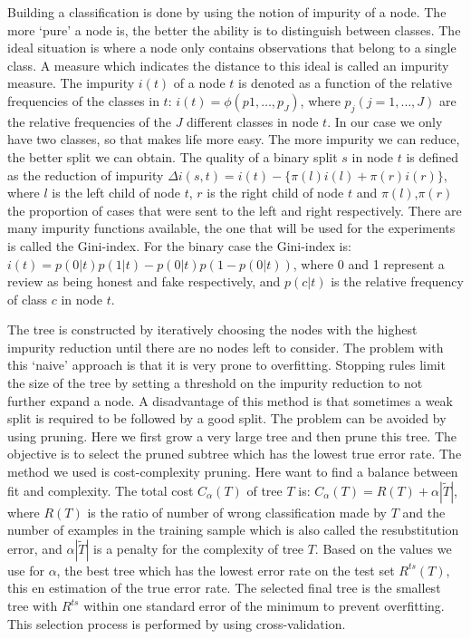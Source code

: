 \documentclass[a4paper,11pt]{article}
\begin{document}
Building a classification is done by using the notion of impurity of a node. The more `pure' a node is, the better the ability is to distinguish between classes. The ideal situation is where a node only contains observations that belong to a single class. A measure which indicates the distance to this ideal is called an impurity measure. The impurity $i(t)$ of a node $t$ is denoted as a function of the relative frequencies of the classes in $t$: $i(t) = \phi(p1,\ldots,p_J)$, where $p_j(j=1,\ldots, J)$ are the relative frequencies of the $J$ different classes in node $t$. In our case we only have two classes, so that makes life more easy. The more impurity we can reduce, the better split we can obtain. The quality of a binary split $s$ in node $t$ is defined as the reduction of impurity $\Delta i(s,t) = i(t) - \{\pi(l)i(l)+\pi(r)i(r)\}$, where $l$ is the left child of node $t$, $r$ is the right child of node $t$ and $\pi(l)$,$\pi(r)$ the proportion of cases that were sent to the left and right respectively. There are many impurity functions available, the one that will be used for the experiments is called the Gini-index. For the binary case the Gini-index is: $i(t) = p(0|t)p(1|t) - p(0|t)p(1-p(0|t))$, where 0 and 1 represent a review as being honest and fake respectively, and $p(c|t)$ is the relative frequency of class $c$ in node $t$. 

The tree is constructed by iteratively choosing the nodes with the highest impurity reduction until there are no nodes left to consider. The problem with this `naive' approach is that it is very prone to overfitting. Stopping rules limit the size of the tree by setting a threshold on the impurity reduction to not further expand a node. A disadvantage of this method is that sometimes a weak split is required to be followed by a good split. The problem can be avoided by using pruning. Here we first grow a very large tree and then prune this tree. The objective is to select the pruned subtree which has the lowest true error rate. The method we used is cost-complexity pruning. Here want to find a balance between fit and complexity. The total cost $C_\alpha(T)$ of tree $T$ is: $C_\alpha(T) = R(T) + \alpha|\tilde{T}|$, where $R(T)$ is the ratio of number of wrong classification made by $T$ and the number of examples in the training sample which is also called the resubstitution error, and $\alpha|\tilde{T}|$ is a penalty for the complexity of tree $T$. Based on the values we use for $\alpha$, the best tree which has the lowest error rate on the test set $R^{ts}(T)$, this en estimation of the true error rate. The selected final tree is the smallest tree with $R^{ts}$ within one standard error of the minimum to prevent overfitting. This selection process is performed by using cross-validation. 
 
\end{document}
